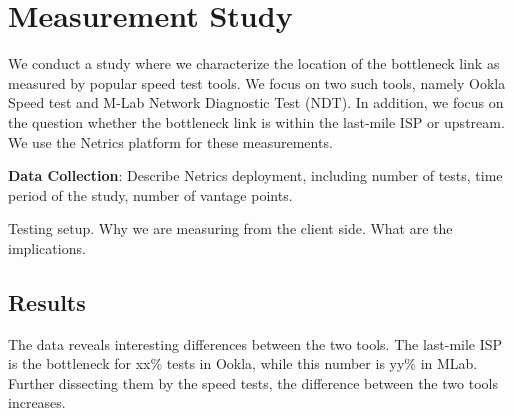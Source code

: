 \section{Measurement Study}
We conduct a study where we characterize the location of the bottleneck link as measured by popular speed test tools. We focus on two such tools, namely Ookla Speed test and M-Lab Network Diagnostic Test (NDT). In addition, we focus on the question whether the bottleneck link is within the last-mile ISP or upstream. We use the Netrics platform for these measurements. 

\textbf{Data Collection}: 
Describe Netrics deployment, including number of tests, time period of the study, number of vantage points. 

Testing setup. Why we are measuring from the client side. What are the implications. 

\subsection{Results}

The data reveals interesting differences between the two tools. The last-mile ISP is the bottleneck for xx\% tests in Ookla, while this number is yy\% in MLab. Further dissecting them by the speed tests, the difference between the two tools increases. 

